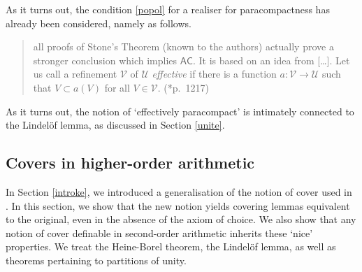 \documentclass[reqno]{amsart}
\def\di{\rightarrow}
\numberwithin{equation}{section}
\numberwithin{thm}{section}
\begin{document}
As it turns out, the condition \eqref{popol} for a realiser for paracompactness has already been considered, namely as follows.  
\begin{quote}
all proofs of Stone's Theorem (known to the authors) actually prove a stronger conclusion which implies $\mathsf{AC}$. It
is based on an idea from [\dots]. Let us call a refinement $\mathcal{V}$ of $\mathcal{U}$ \emph{effective} if there is
a function $a : \mathcal{V} \di \mathcal{U}$ such that $V \subset a(V)$ for all $V \in  \mathcal{V}$. (\cite{goodgoing}*{p.\ 1217})
\end{quote}
As it turns out, the notion of `effectively paracompact' is intimately connected to the Lindel\"of lemma, as discussed in Section \ref{unite}. 





\subsection{Covers in higher-order arithmetic}\label{kerkend}
In Section \ref{introke}, we introduced a generalisation of the notion of cover used in \cite{dagsamIII, dagsamV}.  
In this section, we show that the new notion yields covering lemmas equivalent to the original, even in the absence of the axiom of choice. 
We also show that any notion of cover definable in second-order arithmetic inherits these `nice' properties.  We treat the Heine-Borel theorem, the Lindel\"of lemma, as well as theorems pertaining to partitions of unity. 
\end{document}
